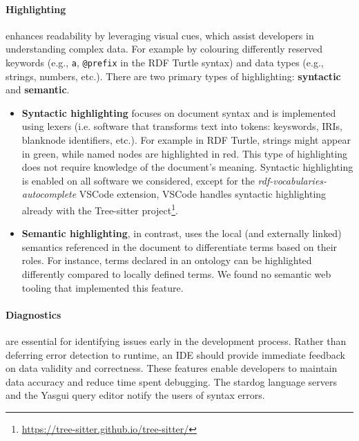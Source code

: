 \paragraph*{Highlighting} enhances readability by leveraging visual cues, which assist developers in understanding complex data.
For example by colouring differently reserved keywords (e.g., \texttt{a}, \texttt{@prefix} in the RDF Turtle syntax) and data types (e.g., strings, numbers, etc.).  
There are two primary types of highlighting: \textbf{syntactic} and \textbf{semantic}.

\begin{itemize}
    \item \textbf{Syntactic highlighting} focuses on document syntax and is implemented using lexers (i.e. software that transforms text into tokens: keyswords, IRIs, blanknode identifiers, etc.).
      For example in RDF Turtle, strings might appear in green, while named nodes are highlighted in red.
      This type of highlighting does not require knowledge of the document's meaning.
      Syntactic highlighting is enabled on all software we considered, except for the 
      \textit{rdf-vocabularies-autocomplete} VSCode extension, VSCode handles syntactic highlighting already with the Tree-sitter project\footnote{\url{https://tree-sitter.github.io/tree-sitter/}}.
    \item \textbf{Semantic highlighting}, in contrast, uses the local (and externally linked) semantics referenced in the document to differentiate terms based on their roles. 
      For instance, terms declared in an ontology can be highlighted differently compared to locally defined terms.
      We found no semantic web tooling that implemented this feature.
\end{itemize}


\paragraph*{Diagnostics} are essential for identifying issues early in the development process. 
Rather than deferring error detection to runtime, an IDE should provide immediate feedback on data validity and correctness.
These features enable developers to maintain data accuracy and reduce time spent debugging. 
The stardog language servers and the Yasgui query editor notify the users of syntax errors.

